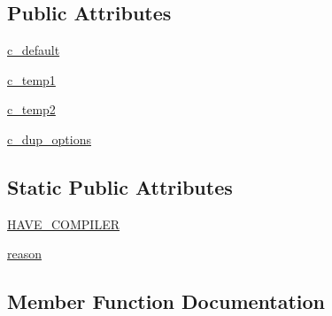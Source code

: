 \subsection*{Public Attributes}
\begin{DoxyCompactItemize}
\item 
\hyperlink{classnumpy_1_1distutils_1_1tests_1_1test__system__info_1_1TestSystemInfoReading_a22343b92fa749e11bed353ccdb6e563d}{c\+\_\+default}
\item 
\hyperlink{classnumpy_1_1distutils_1_1tests_1_1test__system__info_1_1TestSystemInfoReading_a1e01162e52f20c9c3a29c5a51a6af15e}{c\+\_\+temp1}
\item 
\hyperlink{classnumpy_1_1distutils_1_1tests_1_1test__system__info_1_1TestSystemInfoReading_a53a6b771c215eb28ca84ba69ead58aaa}{c\+\_\+temp2}
\item 
\hyperlink{classnumpy_1_1distutils_1_1tests_1_1test__system__info_1_1TestSystemInfoReading_a44a2c742978e894ccbc02f0944834c0a}{c\+\_\+dup\+\_\+options}
\end{DoxyCompactItemize}
\subsection*{Static Public Attributes}
\begin{DoxyCompactItemize}
\item 
\hyperlink{classnumpy_1_1distutils_1_1tests_1_1test__system__info_1_1TestSystemInfoReading_a12168f8bb2c390c4f1f4ea03d216cecc}{H\+A\+V\+E\+\_\+\+C\+O\+M\+P\+I\+L\+ER}
\item 
\hyperlink{classnumpy_1_1distutils_1_1tests_1_1test__system__info_1_1TestSystemInfoReading_a4b51a0de574b7bb23134ffc02614d112}{reason}
\end{DoxyCompactItemize}


\subsection{Member Function Documentation}
\mbox{\label{classnumpy_1_1distutils_1_1tests_1_1test__system__info_1_1TestSystemInfoReading_a463675e83d778ff5c539982ff0ad499a}} 
